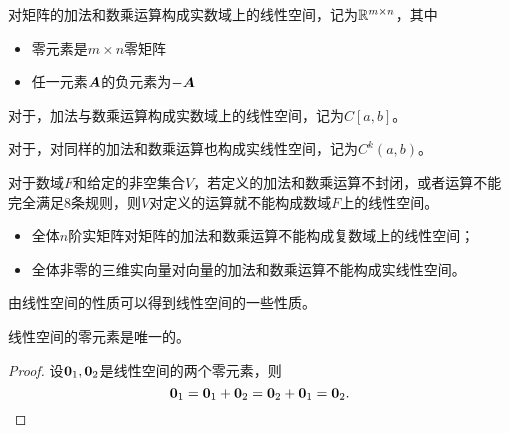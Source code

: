 \begin{frame}
  \begin{li}

    对矩阵的加法和数乘运算构成实数域上的线性空间，记为$\mathbb{R}^{m\times n}$，其中
    \begin{itemize}
      \item 零元素是$m\times n$零矩阵
      \item 任一元素$\boldsymbol{A}$的负元素为$-\boldsymbol{A}$
    \end{itemize}
  \end{li} 
\end{frame}

\begin{frame}
  \begin{li}

    对于，加法与数乘运算构成实数域上的线性空间，记为$C[a,b]$。  


    对于，对同样的加法和数乘运算也构成实线性空间，记为$C^k(a,b)$。
  \end{li} 
\end{frame}

\begin{frame}
  对于数域$F$和给定的非空集合$V$，若定义的加法和数乘运算不封闭，或者运算不能完全满足$8$条规则，则$V$对定义的运算就不能构成数域$F$上的线性空间。

  \begin{li}
    \begin{itemize}
      \item 全体$n$阶实矩阵对矩阵的加法和数乘运算不能构成复数域上的线性空间；

      \item 全体非零的三维实向量对向量的加法和数乘运算不能构成实线性空间。
    \end{itemize}
  \end{li}
\end{frame}

\begin{frame}
由线性空间的性质可以得到线性空间的一些性质。\pause 

\begin{xingzhi}
  线性空间的零元素是唯一的。
\end{xingzhi} \pause 
\begin{proof}
  设$\M0_1, \M0_2$是线性空间的两个零元素，则
  $$
  \M0_1 = \M0_1+\M0_2 = \M0_2+\M0_1 = \M0_2.
  $$
\end{proof}
\end{frame}

